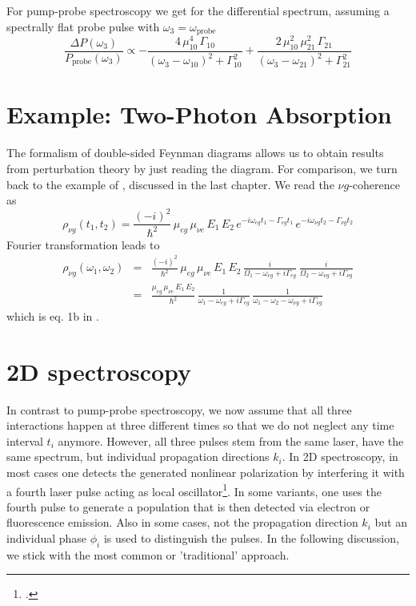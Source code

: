 For pump-probe spectroscopy we get for the differential spectrum, assuming a spectrally flat probe pulse with $\omega_3 = \omega_\text{probe}$
\begin{equation}
\frac{\Delta P (\omega_3)} {P_\text{probe}(\omega_3)} 
\propto
- \frac{4 \, \mu_{10}^4 \, \Gamma_{10} } { (\omega_3 - \omega_{10})^2 + \Gamma_{10}^2} 
+ \frac{2 \, \mu_{10}^2  \, \mu_{21}^2 \, \Gamma_{21} } { (\omega_3 - \omega_{21})^2 + \Gamma_{21}^2} 
\end{equation}


\section{Example: Two-Photon Absorption}

The formalism of double-sided Feynman diagrams allows us to obtain results from perturbation theory by just reading the diagram. For comparison, we turn back to the example of \cite{Winterhalder11}, discussed in the last chapter. We read the $\nu g $-coherence as
\begin{equation}
\rho_{\nu g}(t_1, t_2) = \frac{(-i)^2}{\hbar^2} \, \mu_{eg} \, \mu_{\nu e} \, E_1 \, E_2 \,
e^{-i \omega_{eg} t_1 - \Gamma_{eg} t_1} \, 
e^{-i \omega_{\nu g} t_2 - \Gamma_{\nu g} t_2} 
\end{equation}
Fourier transformation leads to
\begin{eqnarray}
\rho_{\nu g}(\omega_1, \omega_2) &=& \frac{(-i)^2}{\hbar^2} \, \mu_{eg} \, \mu_{\nu e} \, E_1 \, E_2 \,
    \frac{i }{\Omega_1 - \omega_{eg}  + i \Gamma_{eg} } 
  \, \frac{i }{\Omega_2  -\omega_{\nu g}  + i \Gamma_{\nu g} } \\
  &=& \frac{\mu_{eg} \, \mu_{\nu e} \, E_1 \, E_2 }{\hbar^2} \,
  \frac{1 }{\omega_1 - \omega_{eg}  + i \Gamma_{eg} } 
  \, \frac{1}{\omega_1 - \omega_2  -\omega_{\nu g}  + i \Gamma_{\nu g} } 
\end{eqnarray}
which is eq. 1b in \cite{Winterhalder11}.
 

\section{2D spectroscopy}


In contrast to pump-probe spectroscopy, we now assume that all three interactions happen at three different times so that we do not neglect any time interval $t_i$ anymore. However, all three pulses stem from the same laser, have the same spectrum, but individual propagation directions $k_i$. In 2D spectroscopy, in most cases one detects the generated nonlinear polarization by  interfering it with a fourth laser pulse acting as local oscillator\footcite{Ogilvie15,Scholes13}. In some variants, one uses the fourth pulse to generate a population that is then detected via electron or fluorescence emission. Also in some cases, not the propagation direction $k_i$ but an individual phase $\phi_i$ is used to distinguish the pulses. In the following discussion, we stick with the most common or 'traditional' approach.

